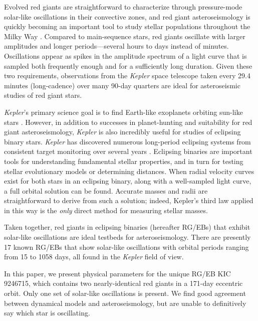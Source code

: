 Evolved red giants are straightforward to characterize through pressure-mode solar-like oscillations in their convective zones, and red giant asteroseismology is quickly becoming an important tool to study stellar populations throughout the Milky Way \citep[for a review of this topic, see][]{cha13}. Compared to main-sequence stars, red giants oscillate with larger amplitudes and longer periods---several hours to days instead of minutes. Oscillations appear as spikes in the amplitude spectrum of a light curve that is sampled both frequently enough and for a sufficiently long duration. Given these two requirements, observations from the \emph{Kepler} space telescope taken every 29.4 minutes (long-cadence) over many 90-day quarters are ideal for asteroseismic studies of red giant stars.

\emph{Kepler}'s primary science goal is to find Earth-like exoplanets orbiting sun-like stars \citep{bor10}. However, in addition to successes in planet-hunting and suitability for red giant asteroseismology, \emph{Kepler} is also incredibly useful for studies of eclipsing binary stars. \emph{Kepler} has discovered numerous long-period eclipsing systems from consistent target monitoring over several years \citep{prs11,sla11}. Eclipsing binaries are important tools for understanding fundamental stellar properties, and in turn for testing stellar evolutionary models or determining distances. When radial velocity curves exist for both stars in an eclipsing binary, along with a well-sampled light curve, a full orbital solution can be found. Accurate masses and radii are straightforward to derive from such a solution; indeed, Kepler's third law applied in this way is the \emph{only} direct method for measuring stellar masses.

Taken together, red giants in eclipsing binaries (hereafter RG/EBs) that exhibit solar-like oscillations are ideal testbeds for asteroseismology. There are presently 17 known RG/EBs that show solar-like oscillations \citep{hek10,gau13,gau14,bec14} with orbital periods ranging from 15 to 1058 days, all found in the \emph{Kepler} field of view.

In this paper, we present physical parameters for the unique RG/EB KIC 9246715, which contains two nearly-identical red giants in a 171-day eccentric orbit. Only one set of solar-like oscillations is present. We find good agreement between dynamical models and asteroseismology, but are unable to definitively say which star is oscillating. %

